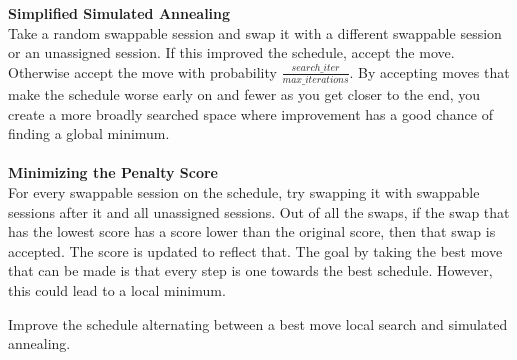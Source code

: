 \textbf{Simplified Simulated Annealing}\\
Take a random swappable session and swap it with a different swappable session or an unassigned session. If this improved the schedule, accept the move. Otherwise accept the move with probability \(\frac{search\_iter}{max\_iterations}\). By accepting moves that make the schedule worse early on and fewer as you get closer to the end, you create a more broadly searched space where improvement has a good chance of finding a global minimum.\\\\

\textbf{Minimizing the Penalty Score}\\
For every swappable session on the schedule, try swapping it with swappable sessions after it and all unassigned sessions. Out of all the swaps, if the swap that has the lowest score has a score lower than the original score, then that swap is accepted. The score is updated to reflect that. The goal by taking the best move that can be made is that every step is one towards the best schedule. However, this could lead to a local minimum.
\begin{pseudocode}{Improve the schedule alternating between a best move local search and simulated annealing.}

\end{pseudocode}